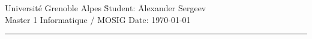 \documentclass{amsart}
\begin{document}
	\begin{tabbing}
		Université Grenoble Alpes \hspace{9.9cm} \= Student: \= Alexander Sergeev \\
		Master 1 Informatique / MOSIG \> Date: \> \today
	\end{tabbing}
	\hrule
	\vspace{1cm}

	
\end{document}
